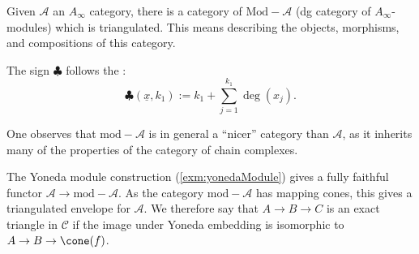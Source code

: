 
 Given $\mathcal A$ an $A_\infty$ category, there is a category of $\text{Mod}- \mathcal A$ (dg category of $A_\infty$-modules) which is triangulated. This means describing the objects, morphisms, and compositions of this category.


The sign $\clubsuit$ follows the :
\[\clubsuit(\underline x,k_1):= k_1+\sum_{j=1}^{k_1} \deg(x_j).\]







One observes that $\text{mod}-\mathcal A$ is in general a ``nicer'' category than $\mathcal A$, as it inherits many of the properties of the category of chain complexes.


The Yoneda module construction (\cref{exm:yonedaModule}) gives a fully faithful functor $\mathcal A \to \text{mod}-\mathcal A$.
As the category $\text{mod}-\mathcal A$ has mapping cones, this gives a triangulated envelope for $\mathcal A$.
We therefore say that $A\to B \to C$ is an exact triangle in $\mathcal C$ if the image under Yoneda embedding is isomorphic to $A\to B \to \cone(f)$.
